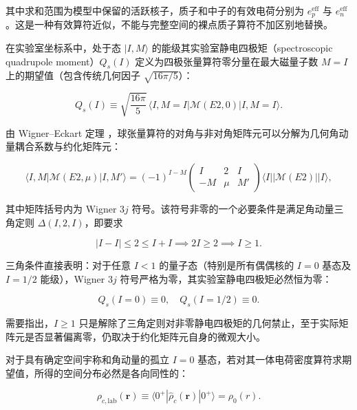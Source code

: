 其中求和范围为模型中保留的活跃核子，质子和中子的有效电荷分别为 $e_p^{\text{eff}}$ 与 $e_n^{\text{eff}}$。这是一种有效算符近似，不能与完整空间的裸点质子算符不加区别地替换。

在实验室坐标系中，处于态 $|I, M\rangle$ 的能级其实验室静电四极矩（spectroscopic quadrupole moment）$Q_s(I)$ 定义为四极张量算符零分量在最大磁量子数 $M = I$ 上的期望值（包含传统几何因子 $\sqrt{16\pi/5}$）：

\begin{equation}\label{eq:1-2-3}
Q_s(I) \equiv \sqrt{\frac{16\pi}{5}} \, \langle I, M=I | \mathcal{M}(E2, 0) | I, M=I \rangle.
\end{equation}

由 Wigner--Eckart 定理 \cite{book-suhonen-from-nucleons-to-nucleus}，球张量算符的对角与非对角矩阵元可以分解为几何角动量耦合系数与约化矩阵元：

\begin{equation}\label{eq:1-2-4}
\langle I, M | \mathcal{M}(E2, \mu) | I, M' \rangle = (-1)^{I - M} \begin{pmatrix} I & 2 & I \\ -M & \mu & M' \end{pmatrix} \langle I || \mathcal{M}(E2) || I \rangle,
\end{equation}

其中矩阵括号内为 Wigner $3j$ 符号。该符号非零的一个必要条件是满足角动量三角定则 $\Delta(I, 2, I)$，即要求

\begin{equation}\label{eq:1-2-5}
|I - I| \le 2 \le I + I \implies 2I \ge 2 \implies I \ge 1.
\end{equation}

三角条件直接表明：对于任意 $I < 1$ 的量子态（特别是所有偶偶核的 $I=0$ 基态及 $I=1/2$ 能级），Wigner $3j$ 符号严格为零，其实验室静电四极矩必然恒为零：

\begin{equation}\label{eq:1-2-6}
Q_s(I=0) \equiv 0, \quad Q_s(I=1/2) \equiv 0.
\end{equation}

需要指出，$I \ge 1$ 只是解除了三角定则对非零静电四极矩的几何禁止，至于实际矩阵元是否显著偏离零，仍取决于约化矩阵元自身的微观大小。

对于具有确定空间宇称和角动量的孤立 $I=0$ 基态，若对其一体电荷密度算符求期望值，所得的空间分布必然是各向同性的：

\begin{equation}\label{eq:1-2-7}
\rho_{c, \text{lab}}(\mathbf{r}) \equiv \langle 0^+ | \hat{\rho}_c(\mathbf{r}) | 0^+ \rangle = \rho_0(r).
\end{equation}

